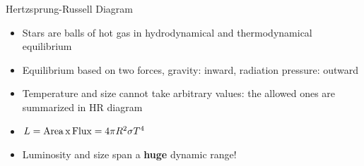 \documentclass[letterpaper,landscape]{slides}
\begin{document}
\begin{slide}
{\begin{minipage}[t]{12cm}
\begin{center}
\vskip -1.1in
\vskip -0.4in
\end{center}
\vskip -0.5in

\end{minipage}

\begin{minipage}[t]{12cm}
\begin{center}
\phantom{xxx}
\vskip -1in
{\large \color{red} Hertzsprung-Russell Diagram }
\end{center}


\begin{itemize}
\item {\color{blue} Stars are balls of hot gas} in hydrodynamical and thermodynamical equilibrium
\item {\color{blue} Equilibrium based on two forces}, gravity: inward, radiation pressure: outward
\item {\color{blue} Temperature and size} cannot take arbitrary values: the allowed ones are 
     summarized in HR diagram 
\item {\color{red} $L = {\rm Area} \, {\rm  x} \, {\rm  Flux} = 4\pi R^2 \sigma T^4$}
\item {\color{blue} Luminosity and size} span a {\bf huge} dynamic range!
\end{itemize}

\end{minipage}}
\vfill 
\end{slide}
\end{document}
